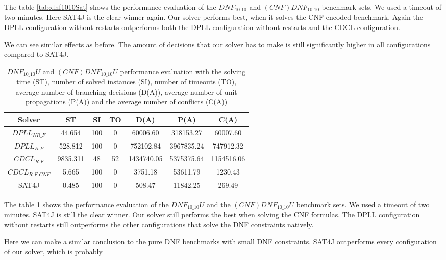 The table \ref{tab:dnf1010Sat} shows the performance evaluation of the $DNF_{10\_10}$ and $(CNF)DNF_{10\_10}$ benchmark sets. We used a timeout of two minutes. Here SAT4J is the clear winner again. Our solver performs best, when it solves the CNF encoded benchmark. Again the DPLL configuration without restarts outperforms both the DPLL configuration without restarts and the CDCL configuration.

We can see similar effects as before. The amount of decisions that our solver has to make is still significantly higher in all configurations compared to SAT4J.

\begin{table}[!htb]
\centering
\caption[$DNF_{10\_10}U$ and $(CNF)DNF_{10\_10}U$ performance evaluation]{$DNF_{10\_10}U$ and $(CNF)DNF_{10\_10}U$ performance evaluation with the solving time (ST), number of solved instances (SI), number of timeouts (TO), average number of branching decisions (D(A)), average number of unit propagations (P(A)) and the average number of conflicts (C(A))}
\label{tab:dnf1010Unsat}
\begin{tabular}{|c|c|c|c|c|c|c|}
\hline
Solver & ST & SI & TO & D(A) & P(A) & C(A)\\ 
\hline
$DPLL_{NR\_F}$ & 44.654 & 100 & 0 & 60006.60 & 318153.27 & 60007.60 \\ 
\hline
$DPLL_{R\_F}$ & 528.812 & 100 & 0 & 752102.84 & 3967835.24 & 747912.32 \\ 
\hline
$CDCL_{R\_F}$ & 9835.311 & 48 & 52 & 1434740.05 & 5375375.64 & 1154516.06 \\ 
\hline
$CDCL_{R\_F\_CNF}$ & 5.665 & 100 & 0 & 3751.18 & 53611.79 & 1230.43 \\ 
\hline
SAT4J & 0.485 & 100 & 0 & 508.47 & 11842.25 & 269.49 \\ 
\hline
\end{tabular}
\end{table}

The table \ref{tab:dnf1010Unsat} shows the performance evaluation of the $DNF_{10\_10}U$ and the $(CNF)DNF_{10\_10}U$ benchmark sets. We used a timeout of two minutes. SAT4J is still the clear winner. Our solver still performs the best when solving the CNF formulas. The DPLL configuration without restarts still outperforms the other configurations that solve the DNF constraints natively.

Here we can make a similar conclusion to the pure DNF benchmarks with small DNF constraints. SAT4J outperforms every configuration of our solver, which is probably

